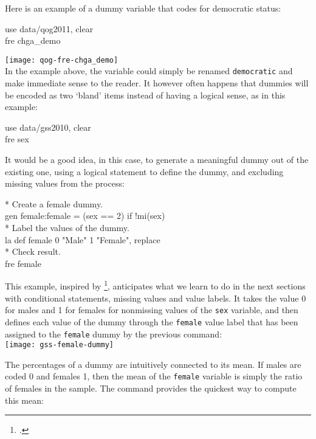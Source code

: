 \begin{description}
	Here is an example of a \QOG dummy variable that codes for democratic status:\\[1em]
	
	\begin{docspec}
		use data/qog2011, clear\\
		fre chga\_demo
	\end{docspec}
	
	\texttt{[image: qog-fre-chga\_demo]}\\[1em]
	
	In the example above, the variable could simply be renamed \texttt{democratic} and make immediate sense to the reader. It however often happens that dummies will be encoded as two `bland' items instead of having a logical sense, as in this \gss example:
	
	\begin{docspec}
		use data/gss2010, clear\\
		fre sex
	\end{docspec}
	
	It would be a good idea, in this case, to generate a meaningful dummy out of the existing one, using a logical statement to define the dummy, and excluding missing values from the process:%
		\label{female-dummy}
	
	\begin{docspec}
		* Create a female dummy.\\
		gen female:female = (sex == 2) if !mi(sex)\\[1em]
		
		* Label the values of the dummy.\\
		la def female 0 "Male" 1 "Female", replace\\[1em]
		
		* Check result.\\
		fre female
	\end{docspec}

	This example, inspired by \footcite[41]{LongFreese:2001a}, anticipates what we learn to do in the next sections with conditional statements, missing values and value labels. It takes the value 0 for males and 1 for females for nonmissing values of the \texttt{sex} variable, and then defines each value of the dummy through the \texttt{female} value label that has been assigned to the \texttt{female} dummy by the previous  command:\\[1em]
	
	\texttt{[image: gss-female-dummy]}
	
	The percentages of a dummy are intuitively connected to its mean. If males are coded 0 and females 1, then the mean of the \texttt{female} variable is simply the ratio of females in the sample. The  command provides the quickest way to compute this mean:
	

\end{description}
